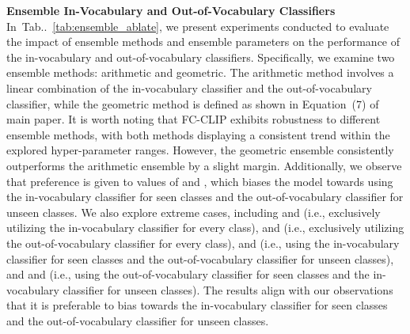 \documentclass{article}
\makeatletter
\DeclareRobustCommand\onedot{\futurelet\@let@token\@onedot}
\def\@onedot{\ifx\@let@token.\else.\null\fi\xspace}
\newcommand{\tabref}[1]{Tab\onedot~\ref{#1}}
\newcommand{\modelname}{FC-CLIP\xspace}
\makeatother
\begin{document}
\noindent \textbf{Ensemble In-Vocabulary and Out-of-Vocabulary Classifiers}\quad
In~\tabref{tab:ensemble_ablate}, we present experiments conducted to evaluate the impact of ensemble methods and ensemble parameters on the performance of the in-vocabulary and out-of-vocabulary classifiers. Specifically, we examine two ensemble methods: arithmetic and geometric. The arithmetic method involves a linear combination of the in-vocabulary classifier and the out-of-vocabulary classifier, while the geometric method is defined as shown in Equation~(7) of main paper.
It is worth noting that \modelname exhibits robustness to different ensemble methods, with both methods displaying a consistent trend within the explored hyper-parameter ranges. However, the geometric ensemble consistently outperforms the arithmetic ensemble by a slight margin. Additionally, we observe that preference is given to values of  and , which biases the model towards using the in-vocabulary classifier for seen classes and the out-of-vocabulary classifier for unseen classes.
We also explore extreme cases, including  and  (i.e., exclusively utilizing the in-vocabulary classifier for every class),  and  (i.e., exclusively utilizing the out-of-vocabulary classifier for every class),  and  (i.e., using the in-vocabulary classifier for seen classes and the out-of-vocabulary classifier for unseen classes), and  and  (i.e., using the out-of-vocabulary classifier for seen classes and the in-vocabulary classifier for unseen classes). The results align with our observations that it is preferable to bias towards the in-vocabulary classifier for seen classes and the out-of-vocabulary classifier for unseen classes.
\end{document}
